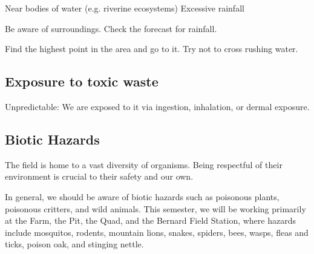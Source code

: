 \documentclass[12pt]{../SOP4_alpha}\usepackage[]{graphicx}\usepackage[]{color}
\begin{document}
Near bodies of water (e.g. riverine ecosystems)
Excessive rainfall

\NP Be aware of surroundings. Check the forecast for rainfall.

\NP Find the highest point in the area and go to it. Try not to cross rushing water. 



\subsection{Exposure to toxic waste}


Unpredictable: We are exposed to it via ingestion, inhalation, or dermal exposure.


\subsection{Biotic Hazards}

\NP The field is home to a vast diversity of organisms. Being respectful of their environment is crucial to their safety and our own.

\NP In general, we should be aware of biotic hazards such as poisonous plants, poisonous critters, and wild animals. This semester, we will be working primarily at the Farm, the Pit, the Quad, and the Bernard Field Station, where hazards include mosquitos, rodents, mountain lions, snakes, spiders, bees, wasps, fleas and ticks, poison oak, and stinging nettle.
\end{document}
